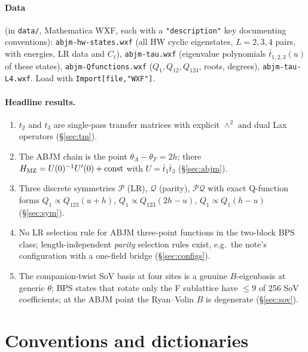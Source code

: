 \documentclass[11pt]{article}
\newcommand{\tb}{\bar t}
\newcommand{\cP}{\mathcal P}
\newcommand{\cQ}{\mathcal Q}
\newcommand{\HMZ}{H_{\rm MZ}}
\newcommand{\nb}[1]{\texttt{#1}}
\begin{document}
\paragraph{Data} (in \nb{data/}, Mathematica WXF, each with a \nb{"description"} key documenting conventions):
\nb{abjm-hw-states.wxf} (all HW cyclic eigenstates, $L=2,3,4$ pairs, with energies, LR data and $C_\ell$),
\nb{abjm-tau.wxf} (eigenvalue polynomials $\tb_{1,2,3}(u)$ of these states), \nb{abjm-Qfunctions.wxf} ($Q_1,Q_{12},Q_{123}$,
roots, degrees), \nb{abjm-tau-L4.wxf}. Load with \nb{Import[file,"WXF"]}.

\paragraph{Headline results.}
\begin{enumerate}
\item $t_2$ and $t_3$ are single-pass transfer matrices with explicit $\wedge^2$ and dual Lax operators (\S\ref{sec:tm}).
\item The ABJM chain is the point $\theta_A-\theta_F=2h$; there $\HMZ=U(0)^{-1}U'(0)+\mathrm{const}$ with
$U=\tb_1\tb_3$ (\S\ref{sec:abjm}).
\item Three discrete symmetries $\cP$ (LR), $\cQ$ (parity), $\cP\cQ$ with exact Q-function forms
$Q_1\propto Q_{123}(u+h)$, $Q_1\propto Q_{123}(2h-u)$, $Q_1\propto Q_1(h-u)$ (\S\ref{sec:sym}).
\item No LR selection rule for ABJM three-point functions in the two-block BPS class; length-independent \emph{parity}
selection rules exist, e.g.\ the note's configuration with a one-field bridge (\S\ref{sec:configs}).
\item The companion-twist SoV basis at four sites is a genuine $B$-eigenbasis at generic $\theta$; BPS states that rotate
only the F sublattice have $\le9$ of 256 SoV coefficients; at the ABJM point the Ryan--Volin $B$ is degenerate
(\S\ref{sec:sov}).
\end{enumerate}

\section{Conventions and dictionaries}\label{sec:conv}
\end{document}
